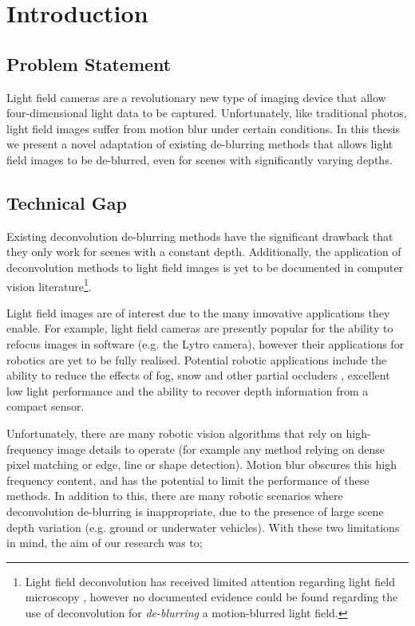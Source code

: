 
\chapter{Introduction}
\label{chap:introduction}

\section{Problem Statement}
\label{sec:problem_statement}

Light field cameras are a revolutionary new type of imaging device that allow four-dimensional light data to be captured.
Unfortunately, like traditional photos, light field images suffer from motion blur under certain conditions.
In this thesis we present a novel adaptation of existing de-blurring methods that allows light field images to be de-blurred, even for scenes with significantly varying depths.

\section{Technical Gap}
\label{sec:technical_gap}

Existing deconvolution de-blurring methods have the significant drawback that they only work for scenes with a constant depth.
Additionally, the application of deconvolution methods to light field images is yet to be documented in computer vision literature\footnote{Light field deconvolution has received limited attention regarding light field microscopy \cite{levoy2006microscopy}, however no documented evidence could be found regarding the use of deconvolution for \emph{de-blurring} a motion-blurred light field.}.

Light field images are of interest due to the many innovative applications they enable.
For example, light field cameras are presently popular for the ability to refocus images in software (e.g. the Lytro camera), however their applications for robotics are yet to be fully realised.
Potential robotic applications include the ability to reduce the effects of fog, snow and other partial occluders \cite{dansereau2013plenoptic}, excellent low light performance and the ability to recover depth information from a compact sensor.

Unfortunately, there are many robotic vision algorithms that rely on high-frequency image details to operate (for example any method relying on dense pixel matching or edge, line or shape detection).
Motion blur obscures this high frequency content, and has the potential to limit the performance of these methods.
In addition to this, there are many robotic scenarios where deconvolution de-blurring is inappropriate, due to the presence of large scene depth variation (e.g. ground or underwater vehicles).
With these two limitations in mind, the aim of our research was to;

